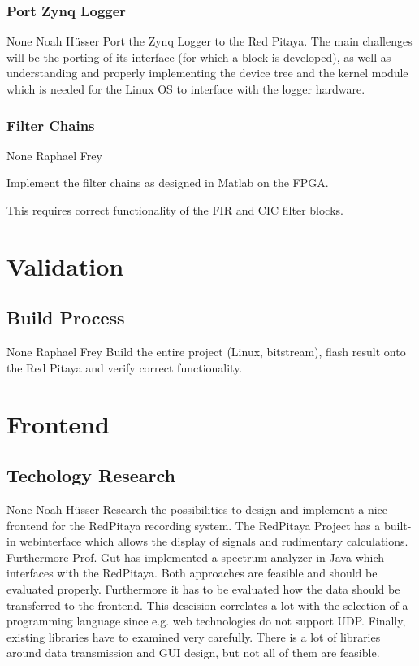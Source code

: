 \documentclass[a4paper,oneside]{alpenspecs/alpenspecs}
\begin{document}
\subsubsection{Port Zynq Logger}
\label{subsubsec:fw:fpga:logger}
\wpac
     {}
     {}
     {}
     {None}
     {}
     {Noah H\"usser}
     {%
         Port the Zynq Logger to the Red Pitaya. The main challenges will be
         the porting of its interface (for which a block 
         is developed), as well as understanding and properly implementing the
         device tree and the kernel module which is needed for the Linux OS
         to interface with the logger hardware.
     }

\subsubsection{Filter Chains}
\label{subsubsec:fw:fpga:filters}
\wpac
     {}
     {}
     {}
     {None}
     {}
     {Raphael Frey}
     {%
         Implement the filter chains as designed in Matlab on the FPGA.

         This requires correct functionality of the FIR and CIC filter
         blocks.
     }


\section{Validation}
\label{sec:validation}

\subsection{Build Process}
\label{subsec:validation:build}
\wpac
     {}
     {}
     {}
     {None}
     {}
     {Raphael Frey}
     {%
         Build the entire project (Linux, bitstream), flash
         result onto the Red Pitaya and verify correct functionality.
     }

\section{Frontend}
\label{sec:frontend}

\subsection{Techology Research}
\label{subsec:frontend:}
\wpac
     {}
     {}
     {}
     {None}
     {}
     {Noah Hüsser}
     {%
         Research the possibilities to design and implement a nice frontend for the RedPitaya recording system.
         The RedPitaya Project has a built-in webinterface which allows the display of signals and rudimentary calculations.
         Furthermore Prof. Gut has implemented a spectrum analyzer in Java which interfaces with the RedPitaya.
         Both approaches are feasible and should be evaluated properly.
         Furthermore it has to be evaluated how the data should be transferred to the frontend.
         This descision correlates a lot with the selection of a programming language since e.g. web technologies do not support UDP.
         Finally, existing libraries have to examined very carefully. There is a lot of libraries around data transmission and GUI design, but not all of them are feasible.
     }
\end{document}
